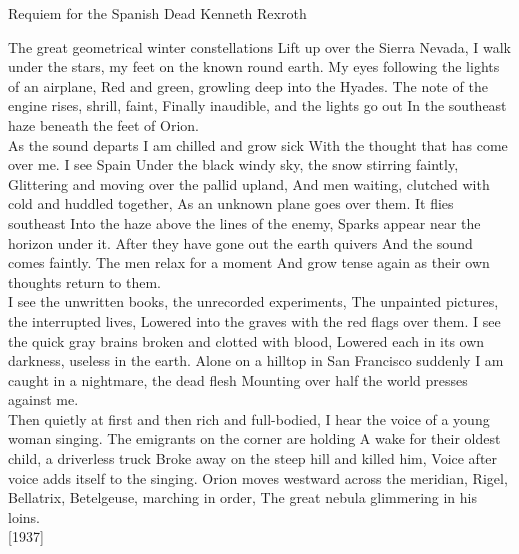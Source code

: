 \begin{poem}
    {Requiem for the Spanish Dead}
    {Kenneth Rexroth}

    The great geometrical winter constellations 
    Lift up over the Sierra Nevada, 
    I walk under the stars, my feet on the known round earth. 
    My eyes following the lights of an airplane, 
    Red and green, growling deep into the Hyades. 
    The note of the engine rises, shrill, faint, 
    Finally inaudible, and the lights go out 
    In the southeast haze beneath the feet of Orion. \\

    As the sound departs I am chilled and grow sick 
    With the thought that has come over me. I see Spain 
    Under the black windy sky, the snow stirring faintly, 
    Glittering and moving over the pallid upland, 
    And men waiting, clutched with cold and huddled together, 
    As an unknown plane goes over them. It flies southeast 
    Into the haze above the lines of the enemy, 
    Sparks appear near the horizon under it. 
    After they have gone out the earth quivers 
    And the sound comes faintly. The men relax for a moment 
    And grow tense again as their own thoughts return to them. \\

    I see the unwritten books, the unrecorded experiments, 
    The unpainted pictures, the interrupted lives, 
    Lowered into the graves with the red flags over them. 
    I see the quick gray brains broken and clotted with blood, 
    Lowered each in its own darkness, useless in the earth. 
    Alone on a hilltop in San Francisco suddenly 
    I am caught in a nightmare, the dead flesh 
    Mounting over half the world presses against me. \\

    Then quietly at first and then rich and full-bodied, 
    I hear the voice of a young woman singing. 
    The emigrants on the corner are holding 
    A wake for their oldest child, a driverless truck 
    Broke away on the steep hill and killed him, 
    Voice after voice adds itself to the singing. 
    Orion moves westward across the meridian, 
    Rigel, Bellatrix, Betelgeuse, marching in order, 
    The great nebula glimmering in his loins. \\

\hfill                                                                               [1937] 
\end{poem}



